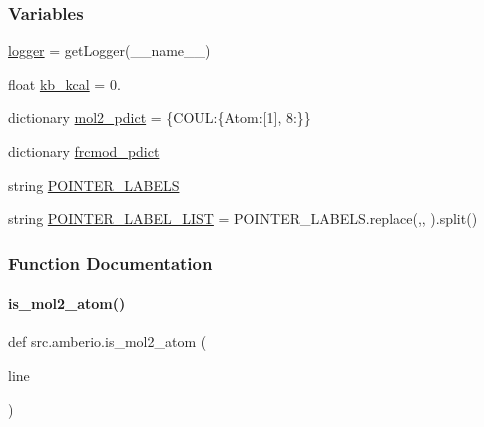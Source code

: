 \subsubsection*{Variables}
\begin{DoxyCompactItemize}
\item 
\hyperlink{namespacesrc_1_1amberio_a393fcac75c6f7641bc423b74d54be7c4}{logger} = get\+Logger(\+\_\+\+\_\+name\+\_\+\+\_\+)
\item 
float \hyperlink{namespacesrc_1_1amberio_acbb6d6c182cf67d8aac7feb23092d430}{kb\+\_\+kcal} = 0.
\item 
dictionary \hyperlink{namespacesrc_1_1amberio_a2c5ebd63f79b3c6412150fd76f0951ae}{mol2\+\_\+pdict} = \{\textquotesingle{}C\+O\+UL\textquotesingle{}\+:\{\textquotesingle{}Atom\textquotesingle{}\+:\mbox{[}1\mbox{]}, 8\+:\textquotesingle{}\textquotesingle{}\}\}
\item 
dictionary \hyperlink{namespacesrc_1_1amberio_a5c0a9d5f44c2ea9fdd2f3ebecd2f0e1e}{frcmod\+\_\+pdict}
\item 
string \hyperlink{namespacesrc_1_1amberio_a310fef0f53ae182324b5e25efe513646}{P\+O\+I\+N\+T\+E\+R\+\_\+\+L\+A\+B\+E\+LS}
\item 
string \hyperlink{namespacesrc_1_1amberio_a846cab198dce2c2fea591135f041ee2e}{P\+O\+I\+N\+T\+E\+R\+\_\+\+L\+A\+B\+E\+L\+\_\+\+L\+I\+ST} = P\+O\+I\+N\+T\+E\+R\+\_\+\+L\+A\+B\+E\+L\+S.\+replace(\textquotesingle{},\textquotesingle{}, \textquotesingle{}\textquotesingle{}).split()
\end{DoxyCompactItemize}


\subsubsection{Function Documentation}
\mbox{\label{namespacesrc_1_1amberio_abe9d4cfc536441837882e79989079f52}} 
\paragraph{\texorpdfstring{is\+\_\+mol2\+\_\+atom()}{is\_mol2\_atom()}}
{\footnotesize\ttfamily def src.\+amberio.\+is\+\_\+mol2\+\_\+atom (\begin{DoxyParamCaption}\item[{}]{line }\end{DoxyParamCaption})}



